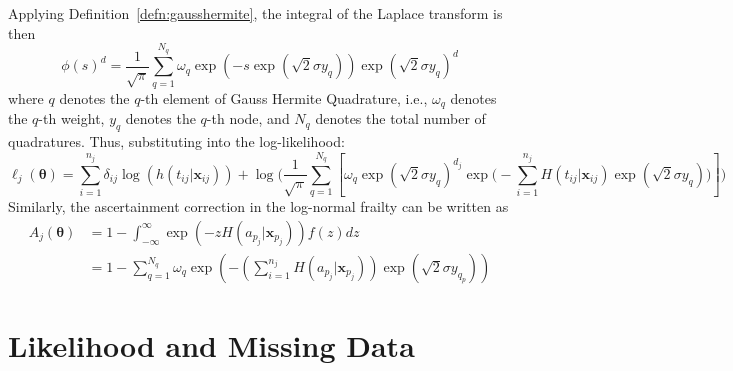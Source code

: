 \documentclass[preprint,12pt]{elsarticle}
\begin{document}
\noindent
Applying Definition~\ref{defn:gausshermite}, the integral of the Laplace transform is then
\begin{equation}
    \phi(s)^d=\frac{1}{\sqrt{\pi}}\sum_{q=1}^{N_{q}}\omega_{q}\exp(-s\exp(\sqrt{2}\sigma y_{q}))\exp(\sqrt{2}\sigma y_{q})^d
\end{equation}
where $q$ denotes the $q$-th element of Gauss Hermite Quadrature, i.e., $\omega_{q}$ denotes the $q$-th weight, $y_{q}$ denotes the $q$-th node, and $N_{q}$ denotes the total number of quadratures. Thus, substituting into the log-likelihood:
\begin{equation}
    \ell_j(\boldsymbol{\theta})=\sum_{i=1}^{n_j}\delta_{ij}\log(h(t_{ij}|\mathbf{x}_{ij}))+\log\Big (\frac{1}{\sqrt{\pi}}\sum_{q=1}^{N_{q}}\left [\omega_{q}\exp(\sqrt{2}\sigma y_{q})^{d_j}\exp\Big (-\sum_{i=1}^{n_j}H(t_{ij}|\mathbf{x}_{ij})\exp(\sqrt{2}\sigma y_{q})\Big )\right ]\Big )
\end{equation}
Similarly, the ascertainment correction in the log-normal frailty can be written as 
\begin{align}
    A_j(\boldsymbol{\theta})&=1-\int_{-\infty}^{\infty} \exp(-z H(a_{p_j}|\mathbf{x}_{p_j}))f(z)dz\\
    &=1-\sum_{q=1}^{N_{q}}\omega_{q} \exp\left (-(\sum_{i=1}^{n_j} H(a_{p_j}|\mathbf{x}_{p_j}))\exp (\sqrt{2}\sigma y_{q_p})\right )
\end{align}

\section{Likelihood and Missing Data}\label{sec:likeandmissing}
\end{document}
